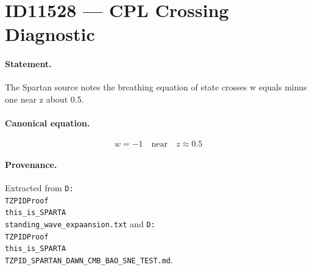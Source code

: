 \section*{ID11528 --- CPL Crossing Diagnostic}

\paragraph{Statement.}
The Spartan source notes the breathing equation of state crosses w equals minus one near z about 0.5.

\paragraph{Canonical equation.}
\[
w=-1\quad\text{near}\quad z\approx0.5
\]

\paragraph{Provenance.}
Extracted from \texttt{D:\\TZPIDProof\\this\_is\_SPARTA\\standing\_wave\_expaansion.txt} and \texttt{D:\\TZPIDProof\\this\_is\_SPARTA\\TZPID\_SPARTAN\_DAWN\_CMB\_BAO\_SNE\_TEST.md}.
